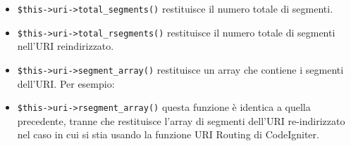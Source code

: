\begin{itemize}
\item \verb|$this->uri->total_segments()| restituisce il numero totale di segmenti.

\item \verb|$this->uri->total_rsegments()| restituisce il numero totale di segmenti nell'URI reindirizzato.

\item \verb|$this->uri->segment_array()| restituisce un array che contiene i segmenti dell'URI. Per esempio:


\item \verb|$this->uri->rsegment_array()| questa funzione è identica a quella precedente, tranne che restituisce l'array di segmenti dell'URI re-indirizzato nel caso in cui si stia usando la funzione URI Routing di CodeIgniter.
\end{itemize}